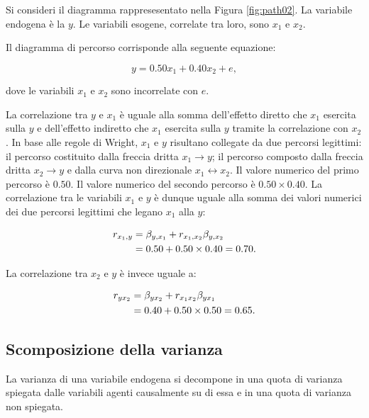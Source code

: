\documentclass[
  11pt,
]{krantz}
\theoremstyle{definition}
\theoremstyle{definition}
\theoremstyle{definition}
\theoremstyle{definition}
\theoremstyle{remark}
\begin{document}
Si consideri il diagramma rappresesentato nella Figura \ref{fig:path02}. La variabile endogena è la \(y\). Le variabili esogene, correlate tra loro, sono \(x_1\) e \(x_2\).

Il diagramma di percorso corrisponde alla seguente equazione:

\[
y = 0.50 x_1 + 0.40 x_2 + e,
\]

dove le variabili \(x_1\) e \(x_2\) sono incorrelate con \(e\).

La correlazione tra \(y\) e \(x_1\) è uguale alla somma dell'effetto diretto che \(x_1\) esercita sulla \(y\) e dell'effetto indiretto che \(x_1\) esercita sulla \(y\) tramite la correlazione con \(x_2\). In base alle regole di Wright, \(x_1\) e \(y\) risultano collegate da due percorsi legittimi: il percorso costituito dalla freccia dritta \(x_1 \rightarrow  y\); il percorso composto dalla freccia dritta \(x_2 \rightarrow  y\) e dalla curva non direzionale \(x_1 \leftrightarrow x_2\). Il valore numerico del primo percorso è \(0.50\). Il valore numerico del secondo percorso è \(0.50\times 0.40\). La correlazione tra le variabili \(x_1\) e \(y\) è dunque uguale alla somma dei valori numerici dei due percorsi legittimi che legano \(x_1\) alla \(y\):

\begin{equation}
\begin{aligned}
  r_{x_1,y} &= \beta_{y,x_1} + r_{x_1,x_2} \beta_{y,x_2}\notag\\
  &=   0.50 + 0.50 \times 0.40 = 0.70.\notag
\end{aligned}
\end{equation}

La correlazione tra \(x_2\) e \(y\) è invece uguale a:

\begin{equation}
\begin{aligned}
  r_{yx_2} &=\beta_{yx_2} + r_{x_1x_2} \beta_{yx_1}\notag\\
  &= 0.40 + 0.50 \times 0.50 = 0.65.\notag
\end{aligned}
\end{equation}

\hypertarget{scomposizione-della-varianza}{%
\subsection{Scomposizione della varianza}\label{scomposizione-della-varianza}}

La varianza di una variabile endogena si decompone in una quota di varianza spiegata dalle variabili agenti causalmente su di essa e in una quota di varianza non spiegata.
\end{document}
